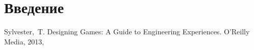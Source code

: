 \chapter{Введение}

\renewcommand{\bibname}{Список используемой литературы}
\begin{thebibliography}{10}
     Sylvester,~T. Designing Games: A Guide to Engineering Experiences. O'Reilly Media, 2013, 
\end{thebibliography}
